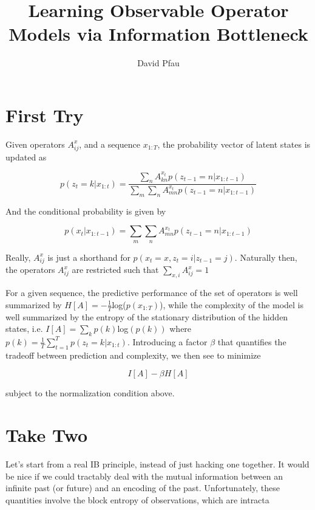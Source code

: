 \documentclass[11pt]{article}
\title{Learning Observable Operator Models via Information Bottleneck}
\author{David Pfau}
\begin{document}
\maketitle

\section{First Try}

Given operators $A^x_{ij}$, and a sequence $x_{1:T}$, the probability vector of latent states is updated as

\[
p(z_t = k|x_{1:t}) = \frac{\sum_n A^{x_t}_{kn} p(z_{t-1}=n|x_{1:t-1})}{\sum_m\sum_n A^{x_t}_{mn} p(z_{t-1}=n|x_{1:t-1})}
\]

And the conditional probability is given by 

\[
p(x_t|x_{1:t-1}) = \sum_m\sum_n A^{x_t}_{mn} p(z_{t-1}=n|x_{1:t-1})
\]

Really, $A^x_{ij}$ is just a shorthand for $p(x_t = x, z_t = i | z_{t-1} = j)$.  Naturally then, the operators $A^x_{ij}$ are restricted such that $\displaystyle\sum_{x,i}A^x_{ij}= 1$

For a given sequence, the predictive performance of the set of operators is well summarized by $H[A] = -\frac{1}{T}$log($p(x_{1:T})$), while the complexity of the model is well summarized by the entropy of the stationary distribution of the hidden states, i.e. $I[A] = \sum_k p(k)$log$(p(k))$ where $p(k) = \frac{1}{T}\displaystyle\sum_{t = 1}^T p(z_t=k|x_{1:t})$.  Introducing a factor $\beta$ that quantifies the tradeoff between prediction and complexity, we then see to minimize 

\[
I[A] - \beta H[A]
\]

subject to the normalization condition above.

\section{Take Two}

Let's start from a real IB principle, instead of just hacking one together.  It would be nice if we could tractably deal with the mutual information between an infinite past (or future) and an encoding of the past.  Unfortunately, these quantities involve the block entropy of observations, which are intracta
\end{document}
